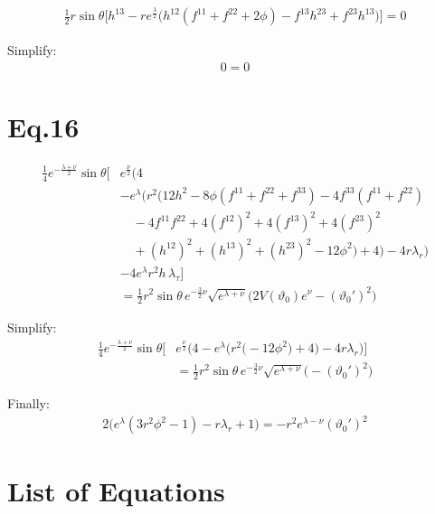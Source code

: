 \documentclass[12pt]{article}
\begin{document}
\begin{align*}
\frac{1}{2} r \sin\theta \Big[
  h^{13}
  - r e^{\frac{\lambda}{2}}
  \big(
    h^{12}(f^{11} + f^{22} + 2\phi)
    - f^{13}h^{23}
    + f^{23}h^{13}
  \big)
\Big] = 0
\end{align*}

Simplify:
\begin{align*}
  0 = 0
\end{align*}

\section*{Eq.16}

\begin{align*}
\frac{1}{4} e^{-\frac{\lambda + \nu}{2}} \sin\theta 
\Big[
  &e^{\frac{\nu}{2}}
  \Big(
    4 \\
    &- e^{\lambda}\Big(
      r^2 \big(
        12 h^2
        - 8\phi(f^{11} + f^{22} + f^{33})
        - 4 f^{33}(f^{11} + f^{22}) \\
        & \quad - 4 f^{11} f^{22}
        + 4 (f^{12})^2 + 4 (f^{13})^2 + 4 (f^{23})^2 \\
        & \quad + (h^{12})^2 + (h^{13})^2 + (h^{23})^2
        - 12\phi^2
      \big)
      + 4
    \Big)
    - 4r\lambda_r
  \Big) \\
  & - 4 e^{\lambda} r^2 h\,\lambda_\tau
\Big] \\
& =
\frac{1}{2} r^2 \sin\theta\,
e^{-\tfrac{3}{2}\nu}
\sqrt{e^{\lambda + \nu}}
\Big(
  2V(\vartheta_0)e^{\nu}
  - (\vartheta_0')^2
\Big)
\end{align*}

Simplify:
\begin{align*}
\frac{1}{4} e^{-\frac{\lambda + \nu}{2}} \sin\theta 
\Big[
  &e^{\frac{\nu}{2}}
  \Big(
    4 - e^{\lambda}\Big(
      r^2 \big(- 12\phi^2\big) + 4
    \Big) - 4r\lambda_r
  \Big) \Big] \\
& =
\frac{1}{2} r^2 \sin\theta\,
e^{-\tfrac{3}{2}\nu}
\sqrt{e^{\lambda + \nu}}
\Big(
  - (\vartheta_0')^2
\Big)
\end{align*}

Finally:
\begin{align*}
2 
\Big(
  e^{\lambda}(3r^2\phi^2 - 1) - r\lambda_r + 1
\Big)
= - r^2 
e^{\lambda-\nu} (\vartheta_0')^2
\end{align*}

\section*{List of Equations}
\end{document}
